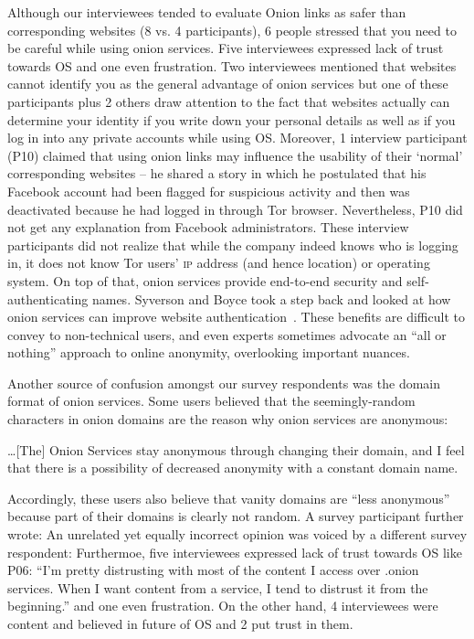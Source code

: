 Although our interviewees tended to evaluate Onion links as safer than corresponding websites (8 vs. 4 participants), 6 people stressed that you need to be careful while using onion services. Five interviewees expressed lack of trust towards OS  and one even frustration.  Two interviewees mentioned that websites cannot identify you as the general advantage of onion services but one of these participants plus 2 others draw attention to the fact that websites actually can determine your identity if you write down your personal details as well as if you log in into any private accounts while using OS. Moreover, 1 interview participant (P10) claimed that using onion links may influence the usability of their ‘normal’ corresponding websites – he shared a story in which he postulated that his Facebook account had been flagged for suspicious activity and then was deactivated because he had logged in through Tor browser.  Nevertheless, P10 did not get any explanation from Facebook administrators. These interview participants did not realize that while the company indeed
knows who is logging in, it does not know Tor users' \textsc{ip} address (and
hence location) or operating system. On top of that, onion services provide
end-to-end security and self-authenticating names.  Syverson and Boyce took a
step back and looked at how onion services can improve website
authentication~\cite{Syverson2015a}.  These benefits are difficult to convey to
non-technical users, and even experts sometimes advocate an ``all or nothing''
approach to online anonymity, overlooking important nuances. 

Another source of confusion amongst our survey respondents was the domain format of
onion services.  Some users believed that the seemingly-random
characters in onion domains are the reason why onion services are anonymous:

\begin{displayquote}
\ldots [The] Onion Services stay anonymous through changing their domain, and I
feel that there is a possibility of decreased anonymity with a constant domain
name.
\end{displayquote}

Accordingly, these users also believe that vanity domains  are ``less anonymous''
because part of their domains is clearly not random.  A survey participant
further wrote:   An unrelated yet
equally incorrect opinion was voiced by a different survey respondent:
 Furthermoe, five interviewees expressed lack of trust towards OS like P06: “I'm pretty distrusting with most of the content I access over .onion services. When I want content from a service, I tend to distrust it from the beginning.” and one even frustration. On the other hand, 4 interviewees were content and believed in future of OS and 2 put trust in them.

